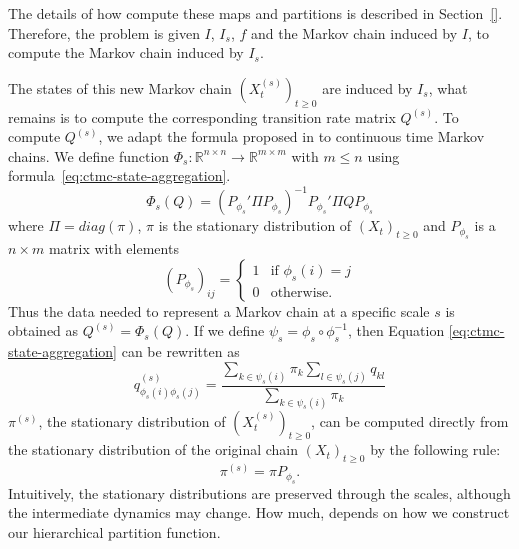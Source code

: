 The details of how compute these maps and partitions is described in Section~\ref{}. Therefore, the problem is given $I$, $I_s$, $f$ and the Markov chain induced by $I$, to compute the Markov chain induced by $I_s$.

The states of this new Markov chain $(X_t^{(s)})_{t \ge 0}$ are induced by $I_s$, what remains is to compute the corresponding  transition rate matrix $Q^{(s)}$. To compute $Q^{(s)}$, we adapt the formula
proposed in \cite{5746509} to continuous time Markov chains. We define function $\Phi_s: \mathbb{R}^{n \times n} \rightarrow \mathbb{R}^{m \times m}$ with $m \le n$ using formula~\ref{eq:ctmc-state-aggregation}.
\begin{equation}
	\label{eq:ctmc-state-aggregation}
	\Phi_s(Q) = (P_{\phi_s}' \Pi P_{\phi_s})^{-1} P_{\phi_s}' \Pi Q P_{\phi_s}
\end{equation}
where $\Pi = diag(\pi)$, $\pi$ is the stationary distribution of $(X_t)_{t \ge 0}$ and $P_{\phi_s}$ is a 
$n \times m$ matrix with elements
\begin{equation}
	\nonumber
	\left(P_{\phi_s}\right)_{ij} = 
		\left\{
			\begin{array}{ll}
				1 & \mbox{if } \phi_s(i) = j \\
				0 & \mbox{otherwise}.
			\end{array}
		\right.
\end{equation}
Thus the data needed to represent a Markov chain at a specific scale $s$ is obtained as $Q^{(s)} = \Phi_s(Q)$.
If we define $\psi_s = \phi_s \circ \phi_s^{-1}$, then Equation \ref{eq:ctmc-state-aggregation} can be rewritten as
\begin{equation}
	\nonumber
	q_{\phi_s(i)\phi_s(j)}^{(s)} = \frac{\sum_{k \in \psi_s(i)}\pi_k \sum_{l \in \psi_s(j)} q_{kl}}{\sum_{k \in \psi_s(i)}\pi_k}
\end{equation}
$\pi^{(s)}$, the stationary distribution of $(X_t^{(s)})_{t \ge 0}$, can be computed directly from
the stationary distribution of the original chain $(X_t)_{t \ge 0}$ by the following rule:
\begin{equation}
	\nonumber
	\pi^{(s)} = \pi P_{\phi_s}.
\end{equation}
Intuitively, the stationary distributions are preserved through the scales, although the intermediate dynamics may change. How much, depends on how we construct our hierarchical partition function. 

 

